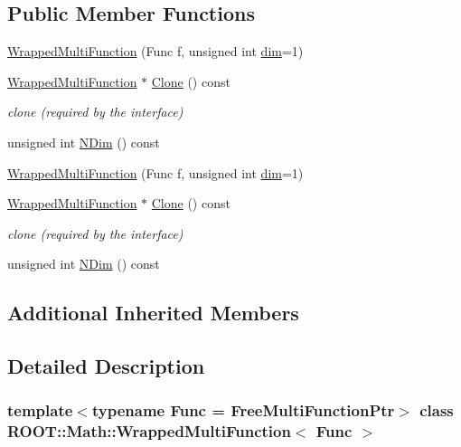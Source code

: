 \subsection*{Public Member Functions}
\begin{DoxyCompactItemize}
\item 
\mbox{\hyperlink{classROOT_1_1Math_1_1WrappedMultiFunction_a015f33dec6c241c6b5662df06ea4ddb9}{Wrapped\+Multi\+Function}} (Func f, unsigned int \mbox{\hyperlink{irrep__util_8cc_a70b5e28b5bc3d1b63a7435c5fe50b837}{dim}}=1)
\item 
\mbox{\hyperlink{classROOT_1_1Math_1_1WrappedMultiFunction}{Wrapped\+Multi\+Function}} $\ast$ \mbox{\hyperlink{classROOT_1_1Math_1_1WrappedMultiFunction_aafa24e359a607b4278f1bf238bdbc336}{Clone}} () const
\begin{DoxyCompactList}\small\item\em clone (required by the interface) \end{DoxyCompactList}\item 
unsigned int \mbox{\hyperlink{classROOT_1_1Math_1_1WrappedMultiFunction_a99de9f7a6e26b03b1cdcf35d8c62d761}{N\+Dim}} () const
\item 
\mbox{\hyperlink{classROOT_1_1Math_1_1WrappedMultiFunction_a015f33dec6c241c6b5662df06ea4ddb9}{Wrapped\+Multi\+Function}} (Func f, unsigned int \mbox{\hyperlink{irrep__util_8cc_a70b5e28b5bc3d1b63a7435c5fe50b837}{dim}}=1)
\item 
\mbox{\hyperlink{classROOT_1_1Math_1_1WrappedMultiFunction}{Wrapped\+Multi\+Function}} $\ast$ \mbox{\hyperlink{classROOT_1_1Math_1_1WrappedMultiFunction_aafa24e359a607b4278f1bf238bdbc336}{Clone}} () const
\begin{DoxyCompactList}\small\item\em clone (required by the interface) \end{DoxyCompactList}\item 
unsigned int \mbox{\hyperlink{classROOT_1_1Math_1_1WrappedMultiFunction_a99de9f7a6e26b03b1cdcf35d8c62d761}{N\+Dim}} () const
\end{DoxyCompactItemize}
\subsection*{Additional Inherited Members}


\subsection{Detailed Description}
\subsubsection*{template$<$typename Func = Free\+Multi\+Function\+Ptr$>$\newline
class R\+O\+O\+T\+::\+Math\+::\+Wrapped\+Multi\+Function$<$ Func $>$}

